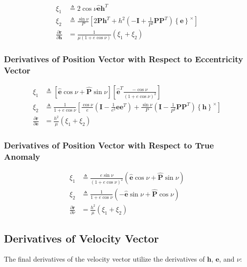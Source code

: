 \documentclass[]{article}
\newcommand{\vb}[1]{\bm{#1}} %
\newcommand{\vbh}[1]{\hat{\bm{#1}}} %
\newcommand{\pd}[2]{\frac{\partial #1}{\partial #2}} %
\newcommand{\crossmat}[1]{\left\{ {#1} \right\}^{\times}} %
\begin{document}
\begin{align}
	\xi_1 &\triangleq 2 \cos{\nu} \vbh{e} \vb{h}^T \\
	\xi_2 &\triangleq \frac{\sin{\nu}}{P} \left[ 2 \vb{P} \vb{h}^T + h^2 \left( -\vb{I} + \frac{1}{P^2} \vb{P} \vb{P}^T \right) \left\{ \vb{e} \right\}^{\times} \right] \\
	\pd{\vb{r}}{\vb{h}} &= \frac{1}{\mu \left(1 + e \cos \nu \right)} \left( \xi_1 + \xi_2 \right)
\end{align}

\subsubsection{Derivatives of Position Vector with Respect to Eccentricity Vector}

\begin{align}
	\xi_1 &\triangleq  \left[ \vbh{e} \cos{\nu} + \vbh{P} \sin{\nu} \right] \left[\vbh{e}^T \frac{-\cos{\nu}}{\left( 1 + e \cos{\nu} \right)^2} \right] \\
	\xi_2 &\triangleq \frac{1}{1 + e \cos{\nu}} \left[ \frac{\cos{\nu}}{e} \left( \vb{I} - \frac{1}{e^2} \vb{e} \vb{e}^T \right) + \frac{\sin{\nu}}{P} \left( \vb{I} - \frac{1}{P^2} \vb{P} \vb{P}^T \right) \crossmat{\vb{h}} \right] \\
	\pd{\vb{r}}{\vb{e}} &= \frac{h^2}{\mu} \left( \xi_1 + \xi_2 \right)
\end{align}

\subsubsection{Derivatives of Position Vector with Respect to True Anomaly}

\begin{align}
	\xi_1 &\triangleq \frac{e \sin{\nu}}{\left(1 + e \cos{\nu} \right)^2} \left( \vbh{e} \cos{\nu} + \vbh{P} \sin{\nu} \right) \\
	\xi_2 &\triangleq \frac{1}{1 + e \cos{\nu}} \left( -\vbh{e} \sin{\nu} + \vbh{P} \cos{\nu} \right) \\
	\pd{\vb{r}}{\nu} &= \frac{h^2}{\mu} \left( \xi_1 + \xi_2 \right)
\end{align}

\subsection{Derivatives of Velocity Vector}

The final derivatives of the velocity vector utilize the derivatives of $\vb{h}$, $\vb{e}$, and $\nu$:
\end{document}

